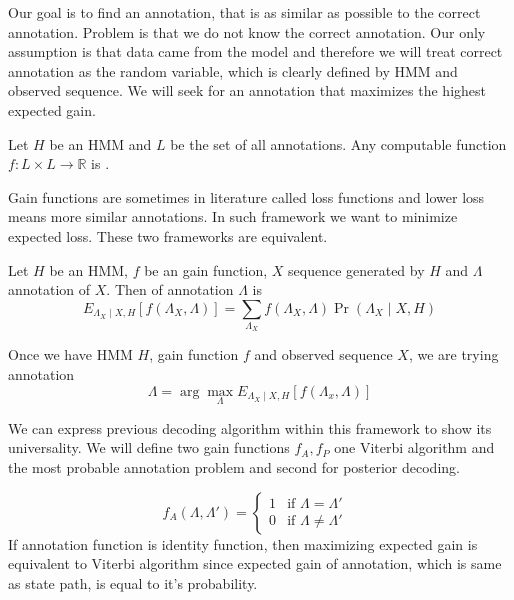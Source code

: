 Our goal is to find an annotation, that is as similar as possible to the correct
annotation. Problem is that we do not know the correct annotation. Our only
assumption is that data came from the model and therefore we will treat correct
annotation as the random variable, which is clearly defined by HMM and observed
sequence. We will seek for an annotation that maximizes the highest expected
gain.

\begin{definition}
Let $H$ be an HMM and $L$ be the set of all annotations. Any computable function
$f:L\times L\to \mathbb{R}$ is .
\end{definition}

\begin{note}
Gain functions are sometimes in literature called loss functions and lower loss
means more similar annotations. In such framework we want to minimize expected
loss. These two frameworks are equivalent.
\end{note}

\begin{definition}
Let $H$ be an HMM, $f$ be an gain function, $X$ sequence generated by $H$ and
$\Lambda$ annotation of $X$. Then  of annotation
$\Lambda$ is 
\begin{equation}
E_{\Lambda_X\mid X,H}[f(\Lambda_X,\Lambda)] =
\sum_{\Lambda_X}f(\Lambda_X,\Lambda)\Pr\left(\Lambda_X\mid X,H\right)
\end{equation}
\end{definition}


Once we have HMM $H$, gain function $f$ and observed sequence $X$,
we are trying annotation
\begin{equation}
\Lambda = \arg\max_{\Lambda}E_{\Lambda_X\mid
X,H}\left[f\left(\Lambda_x,\Lambda\right)\right]
\end{equation}

We can express previous decoding algorithm within this framework to show
its universality. We will define two gain functions $f_A, f_P$ one 
Viterbi algorithm and the most probable annotation problem and second for
posterior decoding.

\begin{equation}
f_A(\Lambda,\Lambda') = \begin{cases}
1 & \text{if $\Lambda = \Lambda'$ }\\
0 & \text{if $\Lambda \not=\Lambda'$}
\end{cases}
\end{equation}
If annotation function is identity function, then maximizing expected gain is 
equivalent to Viterbi algorithm since expected gain of annotation, which is
same as state path, is equal to it's probability.

